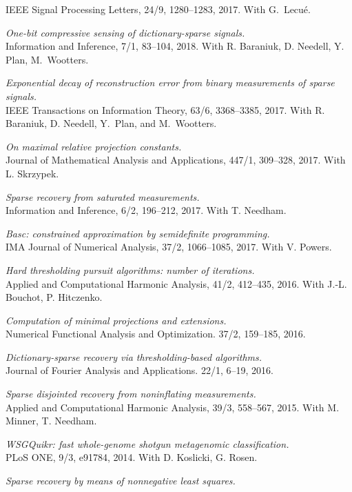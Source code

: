 \documentclass[11pt]{article}
\begin{document}
IEEE Signal Processing Letters, 24/9, 1280--1283, 2017. 
With G.~Lecu\'e.
\item {\sl One-bit compressive sensing of dictionary-sparse signals.}\\
Information and Inference, 7/1, 83--104, 2018.
With R. Baraniuk, D. Needell, Y. Plan, M.~Wootters.
\item {\sl Exponential decay of reconstruction error from binary measurements of sparse signals.}\\
IEEE Transactions on Information Theory, 63/6, 3368--3385, 2017.
With R. Baraniuk, D. Needell, Y.~Plan, and \mbox{M.~Wootters}.
\item {\sl On maximal relative projection constants.}\\
Journal of Mathematical Analysis and Applications,  447/1, 309--328, 2017.
With L. Skrzypek.
\item {\sl  Sparse recovery from saturated measurements.}\\
Information and Inference, 6/2, 196--212, 2017.
With T. Needham.
\item{\sl {\sf Basc}: constrained approximation by semidefinite programming.}\\
IMA Journal of Numerical Analysis, 37/2, 1066--1085, 2017.
With V. Powers.
\item {\sl Hard thresholding pursuit algorithms: number of iterations.}\\
Applied and Computational Harmonic Analysis, 
41/2, 412--435, 2016.
With J.-L. Bouchot, P. Hitczenko. 
\item {\sl Computation of minimal projections and extensions.}\\
Numerical Functional Analysis and Optimization. 37/2, 159--185, 2016.
\item {\sl Dictionary-sparse recovery via thresholding-based algorithms.}\\ 
Journal of Fourier Analysis and Applications. 22/1, 6--19, 2016.
\item {\sl Sparse disjointed recovery from noninflating measurements.}\\
Applied and Computational Harmonic Analysis, 39/3, 558--567, 2015.
With M. Minner, T. Needham.
\item {\sl WSGQuikr: fast whole-genome shotgun metagenomic classification.}\\
PLoS ONE, 9/3, e91784, 2014. 
With D. Koslicki, G. Rosen.
\item{\sl Sparse recovery by means of nonnegative least squares.}\\
\end{document}
